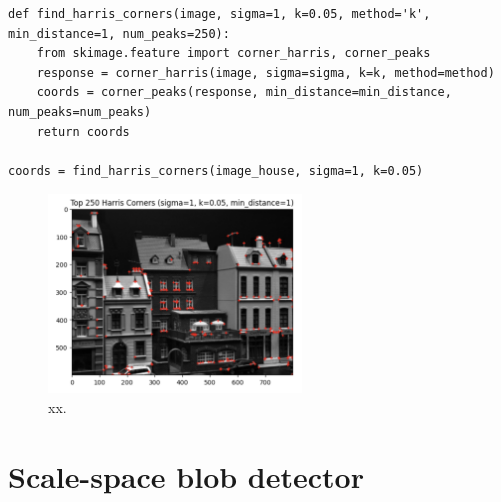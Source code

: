 \documentclass[12pt]{article}
\begin{document}
\begin{lstlisting}
def find_harris_corners(image, sigma=1, k=0.05, method='k', min_distance=1, num_peaks=250):
    from skimage.feature import corner_harris, corner_peaks
    response = corner_harris(image, sigma=sigma, k=k, method=method)
    coords = corner_peaks(response, min_distance=min_distance, num_peaks=num_peaks)
    return coords

coords = find_harris_corners(image_house, sigma=1, k=0.05)
\end{lstlisting}

\begin{figure}[h]
    \centering
    \includegraphics[width=0.6\textwidth]{pics/a5-3.3} 
    \caption{xx.}
\end{figure}

\section{Scale-space blob detector}
\end{document}
